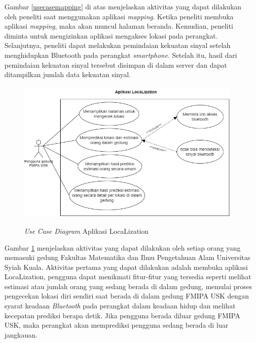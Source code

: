 
\par Gambar \ref{usecasemapping} di atas menjelaskan aktivitas yang dapat dilakukan oleh peneliti saat menggunakan aplikasi \textit{mapping}. Ketika peneliti membuka aplikasi \textit{mapping}, maka akan muncul halaman beranda. Kemudian, peneliti diminta untuk mengizinkan aplikasi mengakses lokasi pada perangkat. Selanjutnya, peneliti dapat melakukan pemindaian kekuatan sinyal setelah menghidupkan Bluetooth pada perangkat \textit{smartphone}. Setelah itu, hasil dari pemindaian kekuatan sinyal tersebut disimpan di dalam server dan dapat ditampilkan jumlah data kekuatan sinyal.
\fancyhf{}
\fancyfoot[R]{\thepage}
\begin{figure}[H]
	\center
	\shadowbox
	{\includegraphics [width=11cm, height=7cm]{gambar/usecasediagrampenguna.drawio.png}}
	\caption{\textit{Use Case Diagram} Aplikasi LocaLization}
	\label{usecasedosen}
\end{figure}

\par Gambar \ref{usecasedosen} menjelaskan aktivitas yang dapat dilakukan oleh setiap orang yang memasuki gedung Fakultas Matematika dan Ilmu Pengetahuan Alam Universitas Syiah Kuala. Aktivitas pertama yang dapat dilakukan adalah membuka aplikasi LocaLization, pengguna dapat menikmati fitur-fitur yang tersedia seperti melihat estimasi atau jumlah orang yang sedang berada di dalam gedung, memulai proses pengecekan lokasi diri sendiri saat berada di dalam gedung FMIPA USK dengan syarat keadaan \textit{Bluetooth} pada perangkat dalam keadaan hidup dan melihat kecepatan prediksi berapa detik. Jika pengguna berada diluar gedung FMIPA USK, maka perangkat akan memprediksi pengguna sedang berada di luar jangkauan.

